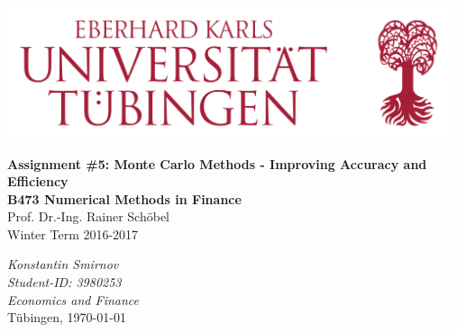 \documentclass[a4paper,11pt]{article}
\begin{document}




\begin{titlepage}       %

\thispagestyle{empty}   %

\begin{center}
\includegraphics[width=13cm]{Bild.png}
\end{center}

\begin{center}

\vspace*{1.5cm}
{\bf  \Large Assignment \#5: Monte Carlo Methods - Improving Accuracy and Efficiency} \\
\vspace*{2cm} 
\textbf{B473 Numerical Methods in Finance}
\\
Prof. Dr.-Ing. Rainer Sch\"obel
\\
\vspace*{0.5cm} 
Winter Term 2016-2017\\
\end{center}

\vfill
\begin{flushright}
    \emph{Konstantin Smirnov}\\
    \textit{Student-ID: 3980253}\\
     \textit{ Economics and Finance}\\
 T\"ubingen, \today
  




\end{flushright}



% 
% 
% 

\end{titlepage}
\end{document}
